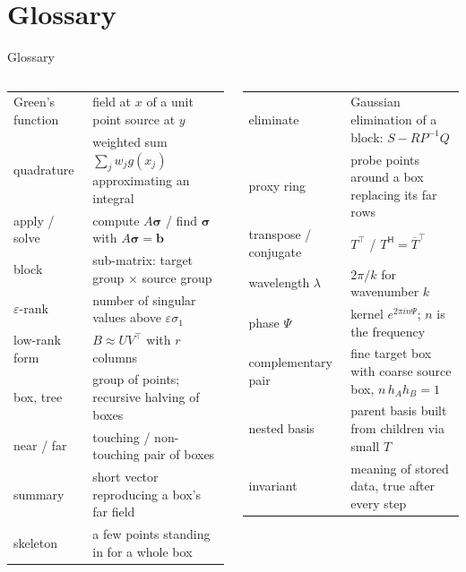 \documentclass[aspectratio=169,10pt,t]{beamer}
\begin{document}
\section*{Glossary}
\begin{frame}{Glossary}
\scriptsize
\renewcommand{\arraystretch}{1.25}
\begin{columns}[T,onlytextwidth]
\begin{tabular}{@{}H{2.1cm}L{4.6cm}@{}}
Green's function & field at $x$ of a unit point source at $y$\\
quadrature & weighted sum $\sum_jw_jg(x_j)$ approximating an integral\\
apply / solve & compute $A\bm\sigma$ / find $\bm\sigma$ with $A\bm\sigma=\bm b$\\
block & sub-matrix: target group $\times$ source group\\
$\varepsilon$-rank & number of singular values above $\varepsilon\sigma_1$\\
low-rank form & $B\approx UV^{\!\top}$ with $r$ columns\\
box, tree & group of points; recursive halving of boxes\\
near / far & touching / non-touching pair of boxes\\
summary & short vector reproducing a box's far field\\
skeleton & a few points standing in for a whole box\\
\end{tabular}
\begin{tabular}{@{}H{2.1cm}L{4.6cm}@{}}
eliminate & Gaussian elimination of a block: $S-RP^{-1}Q$\\
proxy ring & probe points around a box replacing its far rows\\
transpose / conjugate & $T^{\!\top}$ / $T^{\mathsf H}=\overline{T}^{\!\top}$\\
wavelength $\lambda$ & $2\pi/k$ for wavenumber $k$\\
phase $\Psi$ & kernel $e^{2\pi in\Psi}$; $n$ is the frequency\\
complementary pair & fine target box with coarse source box, $n\,h_Ah_B=1$\\
nested basis & parent basis built from children via small $T$\\
invariant & meaning of stored data, true after every step\\
\end{tabular}
\end{columns}
\end{frame}
\end{document}
